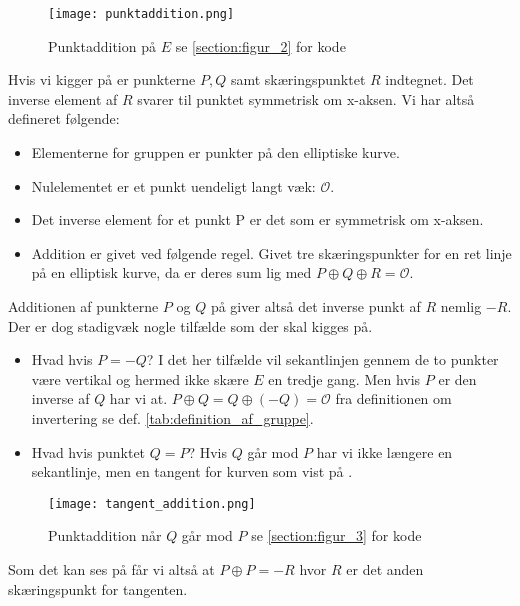 \begin{figure}[H]
    \centering
    \texttt{[image: punktaddition.png]}
    \caption{Punktaddition på $E$ se \ref{section:figur_2} for kode}
    \label{fig:geo_addition}
\end{figure}


Hvis vi kigger på  er punkterne $P, Q$ samt skæringspunktet $R$ indtegnet. Det inverse element af $R$ svarer til punktet symmetrisk om x-aksen. Vi har altså defineret følgende:
\begin{itemize}
	\item Elementerne for gruppen er punkter på den elliptiske kurve.
	\item Nulelementet er et punkt uendeligt langt væk: $\mathcal{O}$.
	\item Det inverse element for et punkt P er det som er symmetrisk om x-aksen.
	\item Addition er givet ved følgende regel. Givet tre skæringspunkter for en ret linje på en elliptisk kurve, da er deres sum lig med $P\oplus Q \oplus R=\mathcal{O}$.
\end{itemize}

Additionen af punkterne $P$ og $Q$ på  giver altså det inverse punkt af $R$ nemlig $-R$. Der er dog stadigvæk nogle tilfælde som der skal kigges på.

\begin{itemize}
    \item Hvad hvis $P=-Q$? I det her tilfælde vil sekantlinjen gennem de to punkter være vertikal og hermed ikke skære $E$ en tredje gang. Men hvis $P$ er den inverse af $Q$ har vi at. $P \oplus Q=Q \oplus (-Q)=\mathcal{O}$ fra definitionen om invertering se def. \ref{tab:definition_af_gruppe}.
    \item Hvad hvis punktet $Q=P$? Hvis $Q$ går mod $P$ har vi ikke længere en sekantlinje, men en tangent for kurven som vist på .
\end{itemize}


\begin{figure}[H]
    \centering
    \texttt{[image: tangent\_addition.png]}
    \caption{Punktaddition når $Q$ går mod $P$ se \ref{section:figur_3} for kode}
    \label{fig:tangent_addition}
\end{figure}

Som det kan ses på  får vi altså at $P\oplus P=-R$ hvor $R$ er det anden skæringspunkt for tangenten.

